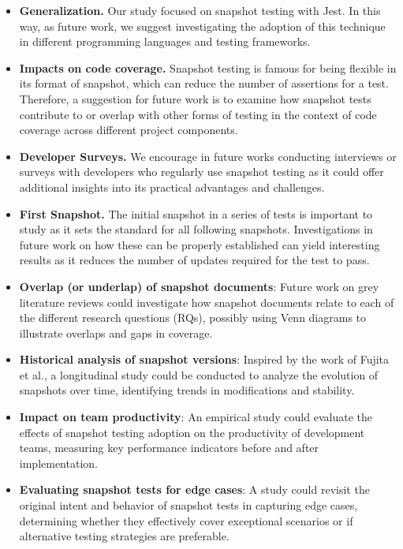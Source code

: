 \documentclass[
	msc, %
	english %
]{../ppgccufmg}
\begin{document}
        \begin{itemize}
          \item \textbf{Generalization.} Our study focused on snapshot testing with Jest. In this way, as future work, we suggest investigating the adoption of this technique in different programming languages and testing frameworks.
          \item \textbf{Impacts on code coverage.} Snapshot testing is famous for being flexible in its format of snapshot, which can reduce the number of assertions for a test. Therefore, a suggestion for future work is to examine how snapshot tests contribute to or overlap with other forms of testing in the context of code coverage across different project components.
          \item \textbf{Developer Surveys.} We encourage in future works conducting interviews or surveys with developers who regularly use snapshot testing as it could offer additional insights into its practical advantages and challenges.
          \item \textbf{First Snapshot.} The initial snapshot in a series of  tests is important to study as it sets the standard for all following snapshots. Investigations in future work on how these can be properly established can yield interesting results as it reduces the number of updates required for the test to pass.
          \item \textbf{Overlap (or underlap) of snapshot documents}: Future work on 
          grey literature reviews could investigate how snapshot documents relate to each of the different research questions (RQs), possibly using Venn diagrams to illustrate overlaps and gaps in coverage.
          \item \textbf{Historical analysis of snapshot versions}: Inspired by the work of Fujita et al., a longitudinal study could be conducted to analyze the evolution of snapshots over time, identifying trends in modifications and stability.
          \item \textbf{Impact on team productivity}: An empirical study could evaluate the effects of snapshot testing adoption on the productivity of development teams, measuring key performance indicators before and after implementation.
          \item \textbf{Evaluating snapshot tests for edge cases}: A study could revisit the original intent and behavior of snapshot tests in capturing edge cases, determining whether they effectively cover exceptional scenarios or if alternative testing strategies are preferable.

\end{itemize}
\end{document}
